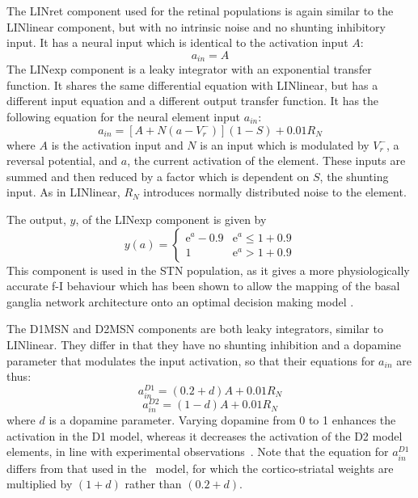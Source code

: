 \documentclass{frontiersSCNS}
\begin{document}
The LINret component used for the retinal populations is again similar
to the LINlinear component, but with no intrinsic noise and no
shunting inhibitory input. It has a neural input which is identical to
the activation input $A$:
\begin{equation}
   a_{in} = A
\end{equation}
The LINexp component is a leaky integrator with an exponential
transfer function. It shares the same differential equation with
LINlinear, but has a different input equation and a different output
transfer function. It has the following equation for the neural
element input $a_{in}$:
\begin{equation}
   a_{in} = [A+N(a-V_{r}^{-})] (1-S) + 0.01 R_N
\end{equation}
where $A$ is the activation input and $N$ is an input which is
modulated by $V_{r}^{-}$, a reversal potential, and $a$, the current
activation of the element. These inputs are summed and then reduced by
a factor which is dependent on $S$, the shunting input. As in
LINlinear, $R_N$ introduces normally distributed noise to the element.

The output, $y$, of the LINexp component is given by
\begin{equation}
   y(a) = \begin{cases}
      \mathrm{e}^{a}-0.9   & \mathrm{e}^a \leq 1+0.9 \\
      1   & \mathrm{e}^a > 1+0.9
   \end{cases}
\end{equation}
This component is used in the STN population, as it gives a more
physiologically accurate f-I
behaviour \cite{wilson_model_2004,bevan_mechanisms_1999,hallworth_apamin-sensitive_2003}
which has been shown to allow the mapping of the basal ganglia network
architecture onto an optimal decision making
model \cite{bogacz_basal_2007}.

The D1MSN and D2MSN components are both leaky integrators, similar to
LINlinear. They differ in that they have no shunting inhibition and a
dopamine parameter that modulates the input activation, so
that their equations for $a_{in}$ are thus:
\begin{equation}
   a_{in}^{D1} = (0.2 + d)A + 0.01 R_N
\end{equation}
\begin{equation}
   a_{in}^{D2} = (1 - d)A + 0.01 R_N
\end{equation}
where $d$ is a dopamine parameter. Varying dopamine from 0 to 1
enhances the activation in the D1 model, whereas it decreases
the activation of the D2 model elements, in line with experimental
observations~\cite{refs}. Note that the equation for $a_{in}^{D1}$
differs from that used in the \ccg~model, for which the
cortico-striatal weights are multiplied by $(1+d)$ rather than
$(0.2+d)$.
\end{document}
